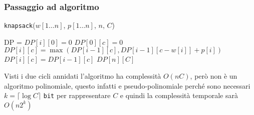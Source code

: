             \subsubsection{Passaggio ad algoritmo}
                \begin{algorithm}
                    \caption{\Int \texttt{knapsack}(\Int[] $w[1 \ldots n]$, \Int[] $p[1 \ldots n]$, \Int $n$, \Int $C$)}
                    \begin{algorithmic}
                        \State DP = \New \Int[0\dots n][0\dots C]
                            \State $DP[i][0]=0$
                        \EndFor
                            \State $DP[0][c]=0$
                        \EndFor
                                    \State $DP[i][c]=\max(DP[i-1][c], DP[i-1][c-w[i]]+p[i])$
                                \Else
                                    \State $DP[i][c]=DP[i-1][c]$
                                \EndIf
                            \EndFor
                        \EndFor
                        \State \Return $DP[n][C]$
                    \end{algorithmic}
                \end{algorithm}
                Visti i due cicli annidati l'algoritmo ha complessità $O(nC)$, però non è un algoritmo polinomiale, questo infatti e pseudo-polinomiale perché sono necessari $k=\lceil\log C\rceil$ \texttt{bit} per rappresentare $C$ e quindi la complessità temporale sarà $O(n2^k)$ 
